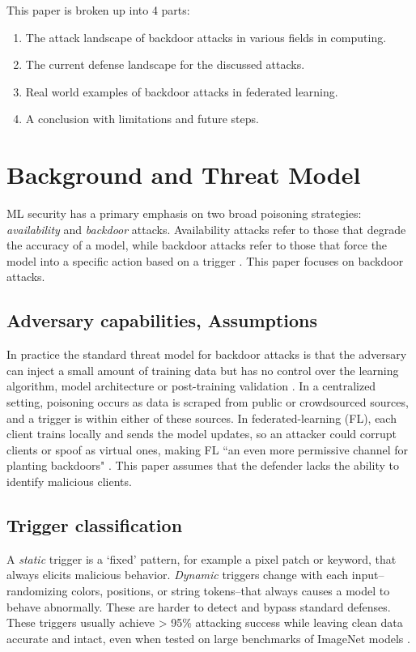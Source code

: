 \documentclass[sigconf,authorversion,nonacm,balance=false]{acmart}
\begin{document}
This paper is broken up into 4 parts:
\begin{enumerate}[leftmargin=1.25em,label=\arabic*.]
  \item The attack landscape of backdoor attacks in various fields in computing.
  \item The current defense landscape for the discussed attacks.
  \item Real world examples of backdoor attacks in federated learning.
  \item A conclusion with limitations and future steps.
\end{enumerate}

\section{Background and Threat Model}
\label{sec:background}
ML security has a primary emphasis on two broad poisoning strategies: \textit{availability} and \textit{backdoor} attacks. Availability attacks refer to those that degrade the accuracy of a model, while backdoor attacks refer to those that force the model into a specific action based on a trigger \cite{background_oprea_2022,background_attack_defense_cina_2024}. This paper focuses on backdoor attacks.

\subsection{Adversary capabilities, Assumptions}
In practice the standard threat model for backdoor attacks is that the adversary can inject a small amount of training data but has no control over the learning algorithm, model architecture or post-training validation \cite{attack_defense_wang_2023}. In a centralized setting, poisoning occurs as data is scraped from public or crowdsourced sources, and a trigger is within either of these sources. In federated-learning (FL), each client trains locally and sends the model updates, so an attacker could corrupt clients or spoof as virtual ones, making FL “an even more permissive channel for planting backdoors" \cite{casestudy_defense_gill_2023,casestudy_walter_2024}. This paper assumes that the defender lacks the ability to identify malicious clients.

\subsection{Trigger classification}
A \textit{static} trigger is a `fixed’ pattern, for example a pixel patch or keyword, that always elicits malicious behavior. 
\textit{Dynamic} triggers change with each input–randomizing colors, positions, or string tokens–that always causes a model to behave abnormally. These are harder to detect and bypass standard defenses. These triggers usually achieve > 95\% attacking success while leaving clean data accurate and intact, even when tested on large benchmarks of ImageNet models \cite{attack_salem_2022}.
\end{document}
